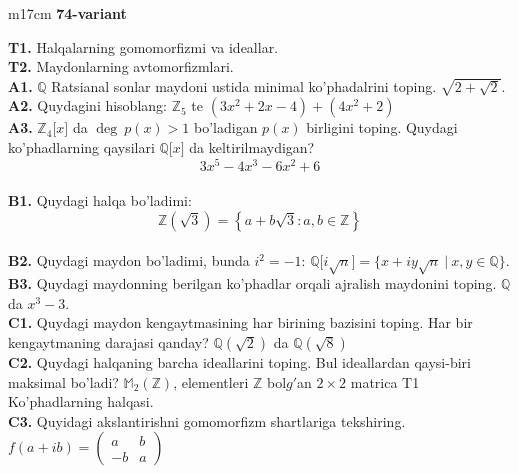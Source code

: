 \documentclass{article}
\begin{document}
\begin{tabular}{m{17cm}}
\textbf{74-variant}
\newline

\textbf{T1.} Halqalarning gomomorfizmi va ideallar. \\
\textbf{T2.} Maydonlarning avtomorfizmlari. \\
\textbf{A1.} \(\mathbb{Q}\) Ratsianal sonlar maydoni ustida minimal ko'phadalrini toping.
\(\sqrt{2 + \sqrt{2}}\). \\
\textbf{A2.} Quydagini hisoblang:
\(\mathbb{Z}_{5}\) te \(\left( 3x^{2} + 2x - 4 \right) + \left( 4x^{2} + 2 \right)\) \\
\textbf{A3.} \(\mathbb{Z}_{4}\lbrack x\rbrack\) da \(\deg\ p(x) > 1\) bo'ladigan \(p(x)\) birligini toping. Quydagi ko'phadlarning qaysilari \(\mathbb{Q\lbrack}x\rbrack\) da keltirilmaydigan?
\[3x^{5} - 4x^{3} - 6x^{2} + 6\] \\
\textbf{B1.} Quydagi halqa bo'ladimi:
\[\mathbb{Z}\left( \sqrt{3} \right) = \left\{ a + b\sqrt{3}:a,b \in \mathbb{Z} \right\}\] \\
\textbf{B2.} Quydagi maydon bo'ladimi, bunda \(i^{2} = - 1\):
\(\mathbb{Q\lbrack}i\sqrt{n}\rbrack = \{ x + iy\sqrt{n}\ |\ x,y \in \mathbb{Q\}}\). \\
\textbf{B3.} Quydagi maydonning berilgan ko'phadlar orqali ajralish maydonini toping.
\(\mathbb{Q}\) da \(x^{3} - 3\). \\
\textbf{C1.} Quydagi maydon kengaytmasining har birining bazisini toping. Har bir kengaytmaning darajasi qanday?
\(\mathbb{Q}\left( \sqrt{2} \right)\) da \(\mathbb{Q}\left( \sqrt{8} \right)\) \\
\textbf{C2.} Quydagi halqaning barcha ideallarini toping. Bul ideallardan qaysi-biri maksimal bo'ladi?
\(\mathbb{M}_{2}\left( \mathbb{Z} \right)\), elementleri \(\mathbb{Z}\) bol\(g'\)an \(2 \times 2\) matrica
T1 Ko'phadlarning halqasi. \\
\textbf{C3.} Quyidagi akslantirishni gomomorfizm shartlariga tekshiring. \(f(a + ib) = \begin{pmatrix}
a & b \\
 - b & a
\end{pmatrix}\) \\

\end{tabular}
\vspace{1cm}
\end{document}
